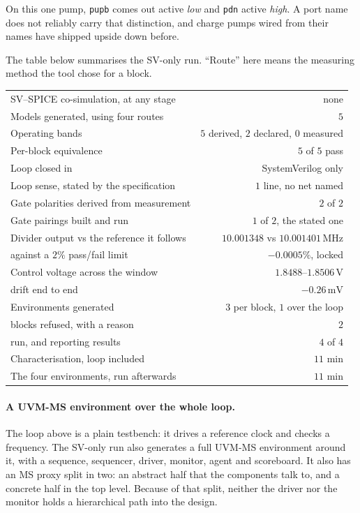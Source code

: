 \documentclass[11pt,a4paper]{article}
\newcommand{\unit}[1]{\,\textrm{#1}}
\begin{document}
\noindent On this one pump, \texttt{pupb} comes out active
\emph{low} and \texttt{pdn} active \emph{high}. A port name does not
reliably carry that distinction, and charge pumps wired from their
names have shipped upside down before.

The table below summarises the SV-only run. ``Route'' here means the
measuring method the tool chose for a block.

\begin{center}
\begin{tabular}{@{}lr@{}}
\toprule
SV--SPICE co-simulation, at any stage   & none \\
Models generated, using four routes       & $5$ \\
Operating bands                         & $5$ derived, $2$ declared, $0$ measured \\
Per-block equivalence                   & $5$ of $5$ pass \\
\midrule
Loop closed in                          & SystemVerilog only \\
Loop sense, stated by the specification  & $1$ line, no net named \\
Gate polarities derived from measurement & $2$ of $2$ \\
Gate pairings built and run              & $1$ of $2$, the stated one \\
Divider output vs the reference it follows & $10.001348$ vs $10.001401\unit{MHz}$ \\
\quad against a $2\%$ pass/fail limit    & $-0.0005\%$, locked \\
Control voltage across the window        & $1.8488$--$1.8506\unit{V}$ \\
\quad drift end to end                   & $-0.26\unit{mV}$ \\
\midrule
Environments generated                  & $3$ per block, $1$ over the loop \\
\quad blocks refused, with a reason      & $2$ \\
\quad run, and reporting results         & $4$ of $4$ \\
\midrule
Characterisation, loop included          & $11$ min \\
The four environments, run afterwards    & $11$ min \\
\bottomrule
\end{tabular}
\end{center}


\paragraph{A UVM-MS environment over the whole loop.} The loop above
is a plain testbench: it drives a reference clock and checks a
frequency. The SV-only run also generates a full UVM-MS environment
around it, with a sequence, sequencer, driver, monitor, agent and
scoreboard. It also has an MS proxy split in two: an abstract half
that the components talk to, and a concrete half in the top level.
Because of that split, neither the driver nor the monitor holds a
hierarchical path into the design.
\end{document}
